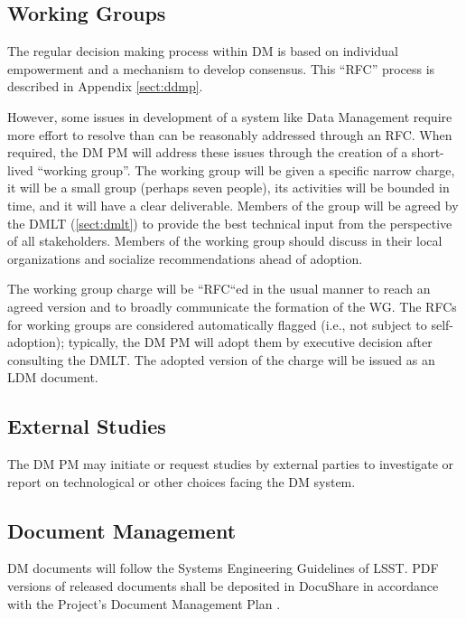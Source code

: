 \subsection {Working Groups} \label{sect:wgs}

The regular decision making process within DM is based on individual empowerment and a mechanism to develop consensus.
This ``RFC'' process is described in Appendix \ref{sect:ddmp}.

However, some issues in development of a system like Data Management require more effort to resolve than can be reasonably addressed through an RFC.
When required, the DM PM will address these issues through the creation of a short-lived ``working group''.
The working group will be given a specific narrow charge, it will be a small group (perhaps seven people), its activities will be bounded in time, and it will have a clear deliverable.
Members of the group will be agreed by the DMLT (\ref{sect:dmlt}) to provide the best technical input from the perspective of all stakeholders.
Members of the working group should discuss in their local organizations and socialize recommendations ahead of adoption.

The working group charge will be ``RFC``ed in the usual manner to reach an agreed version and
to broadly communicate the formation of the WG. The RFCs for working groups are considered automatically flagged (i.e., not
subject to self-adoption); typically, the DM PM will adopt them by executive
decision after consulting the DMLT.  The adopted version of the charge will be issued as an LDM document.


\subsection {External Studies} \label{sect:studies}

The DM PM may initiate or request studies by external parties to investigate or report on technological or other choices facing the DM system.


\subsection {Document Management} \label{sect:docman}

DM documents will follow the Systems Engineering Guidelines of LSST. PDF versions of released documents shall be deposited in DocuShare in accordance with the Project's Document Management Plan .

